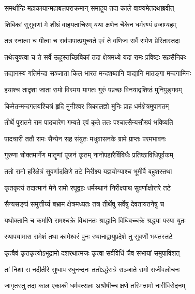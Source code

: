 \twolineshloka
{समर्थान्हि महाकायान्महाबलपराक्रमान्}
{समाहूय तदा काले वाक्यमेतदथाब्रवीत्}%

\twolineshloka
{शिबिकां सुसुवणां मे शीघ्रं वाहयताचिरम्}
{यथा क्षणेन चैकेन धर्मरण्यं व्रजाम्यहम्}%

\twolineshloka
{तत्र स्नात्वा च पीत्वा च सर्वपापात्प्रमुच्यते}
{एवं ते वणिजः सर्वै रामेण प्रेरितास्तदा}%

\twolineshloka
{तथेत्युक्त्वा च ते सर्वे ऊहुस्तच्छिबिकां तदा}
{क्षेत्रमध्ये यदा रामः प्रविष्टः सहसैनिकः}%

\twolineshloka
{तद्यानस्य गतिर्मन्दा सञ्जाता किल भारत}
{मन्दशब्दानि वाद्यानि मातङ्गा मन्दगामिनः}%

\twolineshloka
{हयाश्च तादृशा जाता रामो विस्मय मागतः}
{गुरुं पप्रच्छ विनयाद्वशिष्ठं मुनिपुङ्गवम्}%

\twolineshloka
{किमेतन्मन्दगतयश्चित्रं हृदि मुनीश्वर}
{त्रिकालज्ञो मुनिः प्राह धर्मक्षेत्रमुपागतम्}%

\twolineshloka
{तीर्थे पुरातने राम पादचारेण गम्यते}
{एवं कृते ततः पश्चात्सैन्यसौख्यं भविष्यति}%

\twolineshloka
{पादचारी ततौ रामः सैन्येन सह संयुतः}
{मधुवासनके ग्रामे प्राप्तः परमभावनः}%

\twolineshloka
{गुरुणा चोक्तमार्गेण मातॄणां पूजनं कृतम्}
{नानोपहारैर्विविधैः प्रतिष्ठाविधिपूर्वकम्}%

\twolineshloka
{ततो रामो हरिक्षेत्रं सुवर्णादक्षिणे तटे}
{निरीक्ष्य यज्ञयोग्याश्च भूमीर्वै बहुशस्तथा}%

\twolineshloka
{कृतकृत्यं तदात्मानं मेने रामो रघूद्वहः}
{धर्मस्थानं निरीक्ष्याथ सुवर्णाक्षोत्तरे तटे}%

\twolineshloka
{सैन्यसङ्घं समुत्तीर्य्य बभ्राम क्षेत्रमध्यतः}
{तत्र तीर्थेषु सर्वेषु देवतायतनेषु च}%

\twolineshloka
{यथोक्तानि च कर्माणि रामश्चक्रे विधानतः}
{श्राद्धानि विधिवच्चक्रे श्रद्धया परया युतः}%

\twolineshloka
{स्थापयामास रामेशं तथा कामेश्वरं पुनः}
{स्थानाद्वायुप्रदेशे तु सुवर्णो भयतस्तटे}%

\twolineshloka
{कृत्वैवं कृतकृत्योऽभूद्रामो दशरथात्मजः}
{कृत्वा सर्वविधिं चैव सभायां समुपाविशत्}%

\twolineshloka
{तां निशां स नदीतीरे सुष्वाप रघुनन्दनः}
{ततोऽर्द्धरात्रे सञ्जाते रामो राजीवलोचनः}%

\twolineshloka
{जागृतस्तु तदा काल एकाकी धर्मवत्सलः}
{अश्रौषीच्च क्षणे तस्मिन्रामो नारीविरोदनम्}%

